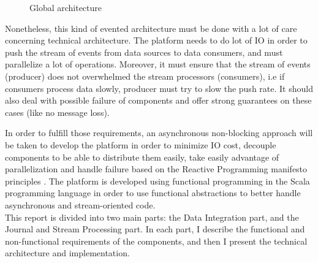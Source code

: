 \begin{figure}[h]
  \begin{center}
    \caption{Global architecture}
    \label{fig:main_archi}
  \end{center}
\end{figure}

Nonetheless, this kind of evented architecture must be done with a lot of care concerning technical architecture.
The platform needs to do lot of IO in order to push the stream of events from data sources to data consumers, and must
parallelize a lot of operations. Moreover, it must ensure that the stream of events (producer) does not overwhelmed the stream
processors (consumers), i.e if consumers process data slowly, producer must try to slow the push rate. It should also deal with possible
failure of components and offer strong guarantees on these cases (like no message loss).

In order to fulfill those requirements, an asynchronous non-blocking approach will be taken to develop the platform in order to
minimize IO cost, decouple components to be able to distribute them easily, take easily advantage of parallelization and handle failure based on the 
Reactive Programming manifesto principles . The platform is developed using functional programming in
the Scala programming language  in order to use functional abstractions to better handle asynchronous and stream-oriented code.
\\

This report is divided into two main parts: the Data Integration part, and the Journal and Stream Processing part.
In each part, I describe the functional and non-functional requirements of the components, and then I present the technical architecture
and implementation.

